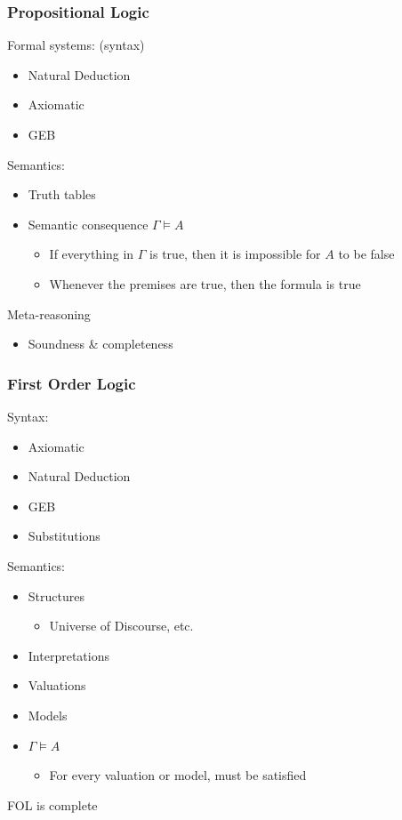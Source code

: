 \documentclass[11pt]{article}
\begin{document}
\subsubsection{Propositional Logic}
\label{sec:orgab05374}
Formal systems: (syntax)
\begin{itemize}
\item Natural Deduction
\item Axiomatic
\item GEB
\end{itemize}
Semantics:
\begin{itemize}
\item Truth tables
\item Semantic consequence \(\Gamma \models A\)
\begin{itemize}
\item If everything in \(\Gamma\) is true, then it is impossible for \(A\) to be false
\item Whenever the premises are true, then the formula is true
\end{itemize}
\end{itemize}
Meta-reasoning
\begin{itemize}
\item Soundness \& completeness
\end{itemize}
\subsubsection{First Order Logic}
\label{sec:orgbc9994a}
Syntax:
\begin{itemize}
\item Axiomatic
\item Natural Deduction
\item GEB
\item Substitutions
\end{itemize}
Semantics:
\begin{itemize}
\item Structures
\begin{itemize}
\item Universe of Discourse, etc.
\end{itemize}
\item Interpretations
\item Valuations
\item Models
\item \(\Gamma \models A\)
\begin{itemize}
\item For every valuation or model, must be satisfied
\end{itemize}
\end{itemize}
FOL is complete
\end{document}
